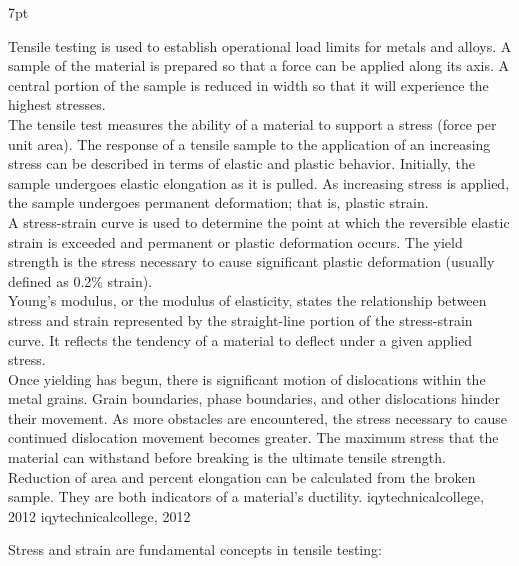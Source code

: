 \documentclass{article}
\newcommand{\formalsource}{} %
\newenvironment{formal}[1][]{%
    \renewcommand{\formalsource}{#1}%
    \def\FrameCommand{%
        \hspace{1pt}%
        {\color{gray}\vrule width 2pt}%
        {\color{white}\vrule width 4pt}%
        \colorbox{white}%
    }%
    \MakeFramed{\advance\hsize-\width\FrameRestore}%
    \noindent\hspace{-4.55pt}%
    \begin{adjustwidth}{}{7pt}%
        \vspace{2pt}%
    }%
    {%
        \vspace{4pt}%
        \ifx\formalsource\empty %
        \else
        \hfill{\footnotesize{\formalsource}}%
        \fi
    \end{adjustwidth}\endMakeFramed%
}
\begin{document}
    \begin{formal}[iqytechnicalcollege, 2012]
        Tensile testing is used to establish operational load limits for metals and alloys. A sample of the material is prepared so that a force can be applied along its axis. A central portion of the sample is reduced in width so that it will experience the highest stresses.\\[8pt]
        The tensile test measures the ability of a material to support a stress (force per unit area). The response of a tensile sample to the application of an increasing stress can be described in terms of elastic and plastic behavior. Initially, the sample undergoes elastic elongation as it is pulled. As increasing stress is applied, the sample undergoes permanent deformation; that is, plastic strain.\\[8pt]
        A stress-strain curve is used to determine the point at which the reversible elastic strain is exceeded and permanent or plastic deformation occurs. The yield strength is the stress necessary to cause significant plastic deformation (usually defined as 0.2\% strain).\\[8pt]
        Young’s modulus, or the modulus of elasticity, states the relationship between stress and strain represented by the straight-line portion of the stress-strain curve. It reflects the tendency of a material to deflect under a given applied stress.\\[8pt]
        Once yielding has begun, there is significant motion of dislocations within the metal grains. Grain boundaries, phase boundaries, and other dislocations hinder their movement. As more obstacles are encountered, the stress necessary to cause continued dislocation movement becomes greater. The maximum stress that the material can withstand before breaking is the ultimate tensile strength.\\[8pt]
        Reduction of area and percent elongation can be calculated from the broken sample. They are both indicators of a material’s ductility.
        \end{formal}

     Stress and strain are fundamental concepts in tensile testing:\\[8pt]
\end{document}

